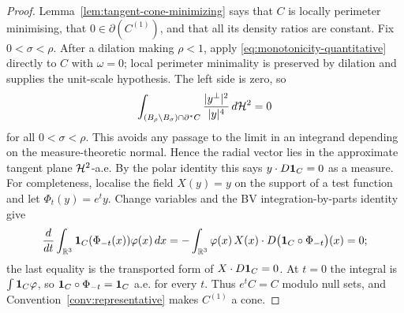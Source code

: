 \begin{proof}
Lemma~\ref{lem:tangent-cone-minimizing} says that $C$ is locally perimeter
minimising, that $0\in\partial(C^{(1)})$, and that all its density ratios are
constant.  Fix $0<\sigma<\rho$.  After a dilation making $\rho<1$, apply
\eqref{eq:monotonicity-quantitative} directly to $C$ with $\omega=0$; local
perimeter minimality is preserved by dilation and supplies the unit-scale
hypothesis.  The left side is zero, so
\begin{equation}\label{eq:cone-vanishing}
  \int_{(B_\rho\setminus B_\sigma)\cap\partial^* C}
  \frac{|y^\perp|^2}{|y|^4}\,d\mathcal H^2=0
\end{equation}
for all $0<\sigma<\rho$.  This avoids any passage to the limit in an integrand
depending on the measure-theoretic normal.  Hence the radial vector lies in
the approximate tangent plane $\mathcal H^2$-a.e.  By the polar identity this says
$y\cdot D\mathbf 1_{C}=0$ as a measure.  For completeness, localise the field
$X(y)=y$ on the support of a test function and let $\Phi_t(y)=e^ty$.  Change
variables and the BV integration-by-parts identity give
\[
 \frac d{dt}\int_{\mathbb R^3}\mathbf 1_{C}(\Phi_{-t}(x))\varphi(x)\,dx
 =-\int_{\mathbb R^3}\varphi(x)\,X(x)\cdot
       D\bigl(\mathbf 1_{C}\circ\Phi_{-t}\bigr)(x)=0;
\]
the last equality is the transported form of $X\cdot D\mathbf 1_{C}=0$.
At $t=0$ the integral is $\int\mathbf 1_{C}\varphi$, so
$\mathbf 1_{C}\circ\Phi_{-t}=\mathbf 1_{C}$ a.e. for every $t$.  Thus $e^tC=C$ modulo null
sets, and
Convention~\ref{conv:representative} makes $C^{(1)}$ a cone.
\end{proof}

